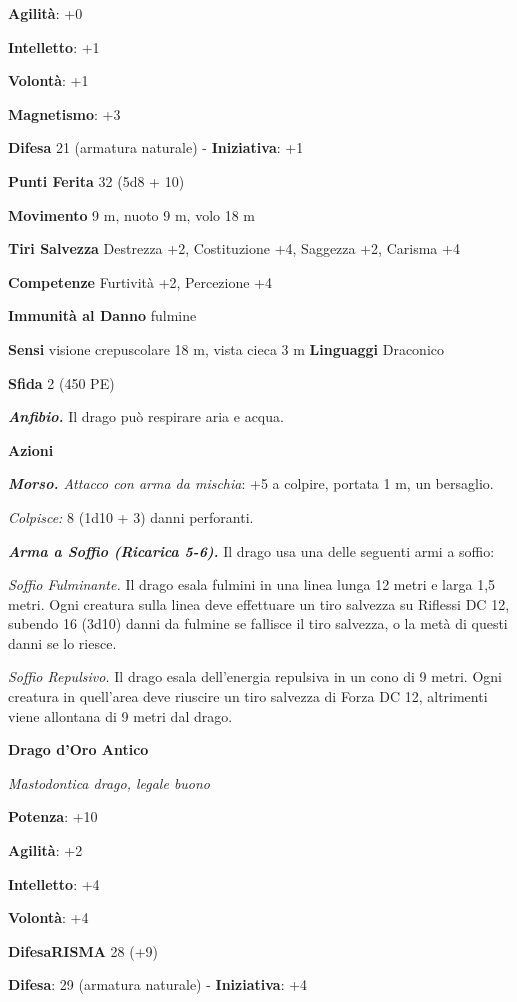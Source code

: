 \begin{multicols}{2}
\textbf{Agilità}: +0

\textbf{Intelletto}: +1

\textbf{Volontà}: +1

\textbf{Magnetismo}: +3

\textbf{Difesa} 21 (armatura naturale) - \textbf{Iniziativa}: +1

\textbf{Punti Ferita} 32 (5d8 + 10)

\textbf{Movimento} 9 m, nuoto 9 m, volo 18 m

\textbf{Tiri Salvezza} Destrezza +2, Costituzione +4, Saggezza +2,
Carisma +4

\textbf{Competenze} Furtività +2, Percezione +4

\textbf{Immunità al Danno} fulmine

\textbf{Sensi} visione crepuscolare 18 m, vista cieca 3 m
\textbf{Linguaggi} Draconico

\textbf{Sfida} 2 (450 PE)\smallskip

\emph{\textbf{Anfibio.}} Il drago può respirare aria e acqua.

\smallskip\textbf{Azioni}

\emph{\textbf{Morso.} Attacco con arma da mischia}: +5 a colpire,
portata 1 m, un bersaglio.

\emph{Colpisce:} 8 (1d10 + 3) danni perforanti.

\emph{\textbf{Arma a Soffio (Ricarica 5-6).}} Il drago usa una delle
seguenti armi a soffio:

\emph{Soffio Fulminante.} Il drago esala fulmini in una linea lunga 12
metri e larga 1,5 metri. Ogni creatura sulla linea deve effettuare un
tiro salvezza su Riflessi DC 12, subendo 16 (3d10) danni da fulmine se
fallisce il tiro salvezza, o la metà di questi danni se lo riesce.

\emph{Soffio Repulsivo.} Il drago esala dell'energia repulsiva in un
cono di 9 metri. Ogni creatura in quell'area deve riuscire un tiro
salvezza di Forza DC 12, altrimenti viene allontana di 9 metri dal
drago.

\textbf{Drago d'Oro Antico}

\emph{Mastodontica drago, legale buono}

\textbf{Potenza}: +10

\textbf{Agilità}: +2

\textbf{Intelletto}: +4

\textbf{Volontà}: +4

\textbf{DifesaRISMA} 28 (+9)

\textbf{Difesa}: 29 (armatura naturale) - \textbf{Iniziativa}: +4


\end{multicols}
